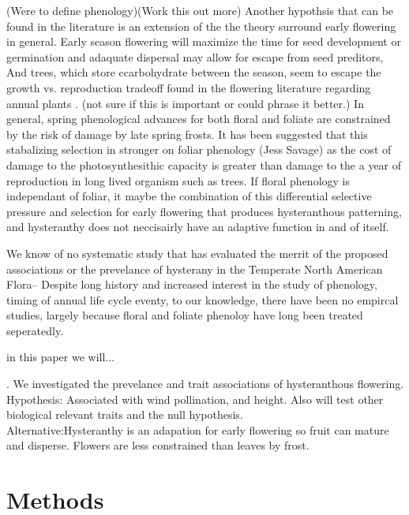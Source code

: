 \documentclass{article}\usepackage[]{graphicx}\usepackage[]{color}
\begin{document}
\par
(Were to define phenology)(Work this out more) Another hypothsis that can be found in the literature is an extension of the the theory surround early flowering in general. Early season flowering will maximize the time for seed development or germination \citep{Bolmgren08} and adaquate dispersal \citep{} may allow for escape from seed preditors\citep{}, And trees, which store ccarbohydrate between the season, seem to escape the growth vs. reproduction tradeoff found in the flowering literature regarding annual plants \citep{}. (not sure if this is important or could phrase it better.) In general, spring phenological advances for both floral and foliate  are constrained by the risk of damage by late spring frosts. It has been suggested that this stabalizing selection in stronger on foliar phenology (Jess Savage) as the cost of damage to the photosynthesithic capacity is greater than damage to the a year of reproduction in long lived organism such as trees. If floral phenology is independant of foliar, it maybe the combination of this differential selective pressure and selection for early flowering that produces hysteranthous patterning, and hysteranthy does not neccisairly have an adaptive function in and of itself.
\par
We know of no systematic study that has evaluated the merrit of the proposed associations or the prevelance of hysterany in the Temperate North American Flora-- Despite long history and increased interest in the study of phenology, timing of annual life cycle eventy,  to our knowledge, there have been no empircal studies, largely because floral and foliate phenoloy have long been treated seperatedly.
\par
in this paper we will...

. We investigated the prevelance and trait associations of hysteranthous flowering.\\
Hypothesis: Associated with wind pollination, and height. Also will test other biological relevant traits and the null hypothesis.\\
Alternative:Hysteranthy is an adapation for early flowering so fruit can mature and disperse. Flowers are less constrained than leaves by frost.

\section{Methods}
\end{document}
